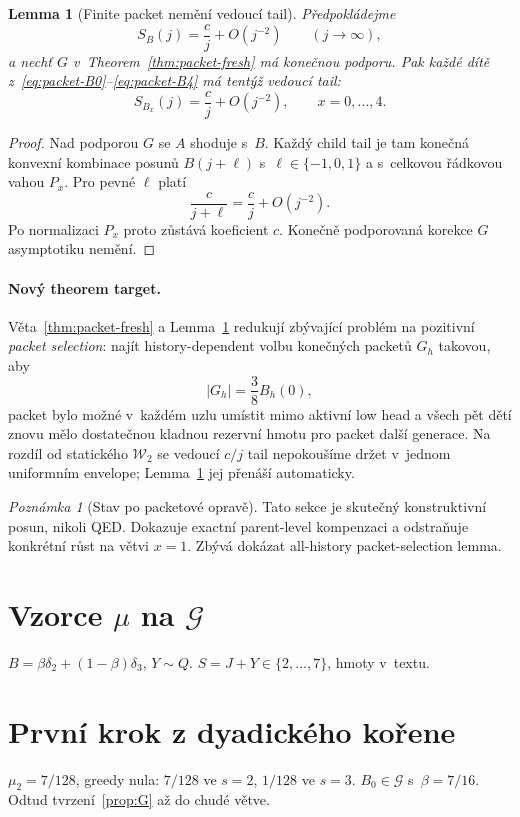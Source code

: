 \documentclass[11pt,a4paper]{article}
\newtheorem{lemma}[theorem]{Lemma}
\theoremstyle{definition}
\theoremstyle{remark}
\newtheorem{remark}[theorem]{Poznámka}
\newcommand{\cG}{\mathcal G}
\newcommand{\cW}{\mathcal W}
\begin{document}
\begin{lemma}[Finite packet nem\v en\'i vedouc\'i tail]
\label{lem:packet-tail}
P\v redpokl\'adejme
\[
S_B(j)=\frac{c}{j}+O(j^{-2})
\qquad(j\to\infty),
\]
a nech\v t $G$ v~Theorem~\ref{thm:packet-fresh} m\'a kone\v cnou podporu.
Pak ka\v zd\'e d\'it\v e z~\eqref{eq:packet-B0}--\eqref{eq:packet-B4} m\'a
tent\'y\v z vedouc\'i tail:
\[
\boxed{
S_{B_x}(j)=\frac{c}{j}+O(j^{-2}),
\qquad x=0,\dots,4.
}
\]
\end{lemma}

\begin{proof}
Nad podporou $G$ se $A$ shoduje s~$B$.
Ka\v zd\'y child tail je tam kone\v cn\'a konvexn\'i kombinace posun\r u
$B(j+\ell)$ s~$\ell\in\{-1,0,1\}$ a s~celkovou \v r\'adkovou vahou $P_x$.
Pro pevn\'e $\ell$ plat\'i
\[
\frac{c}{j+\ell}=\frac{c}{j}+O(j^{-2}).
\]
Po normalizaci $P_x$ proto z\r ust\'av\'a koeficient $c$.
Kone\v cn\v e podporovan\'a korekce $G$ asymptotiku nem\v en\'i.
\end{proof}

\paragraph{Nov\'y theorem target.}
V\v eta~\ref{thm:packet-fresh} a Lemma~\ref{lem:packet-tail} redukuj\'i
zb\'yvaj\'ic\'i probl\'em na pozitivn\'i \emph{packet selection}:
naj\'it history-dependent volbu kone\v cn\'ych packet\r u $G_h$ takovou, aby
\[
|G_h|=\frac38 B_h(0),
\]
packet bylo mo\v zn\'e v~ka\v zd\'em uzlu um\'istit mimo aktivn\'i low head
a v\v sech p\v et d\v et\'i znovu m\v elo dostate\v cnou kladnou rezervn\'i
hmotu pro packet dal\v s\'i generace.
Na rozd\'il od statick\'eho $\cW_2$ se vedouc\'i $c/j$ tail nepokou\v s\'ime
dr\v zet v~jednom uniformn\'im envelope; Lemma~\ref{lem:packet-tail} jej
p\v ren\'a\v s\'i automaticky.

\begin{remark}[Stav po packetov\'e oprav\v e]
Tato sekce je skute\v cn\'y konstruktivn\'i posun, nikoli QED.
Dokazuje exactn\'i parent-level kompenzaci a odstra\v nuje konkr\'etn\'i
r\r ust na v\v etvi $x=1$.
Zb\'yv\'a dok\'azat all-history packet-selection lemma.
\end{remark}


\appendix
\section{Vzorce \(\mu\) na \(\cG\)}
\(B=\beta\delta_2+(1-\beta)\delta_3\), \(Y\sim Q\).
\(S=J+Y\in\{2,\dots,7\}\), hmoty v~textu.

\section{První krok z dyadického kořene}
\(\mu_2=7/128\), greedy nula: \(7/128\) ve \(s=2\), \(1/128\) ve \(s=3\).
\(B_0\in\cG\) s~\(\beta=7/16\). Odtud tvrzení~\ref{prop:G} až do chudé větve.
\end{document}
